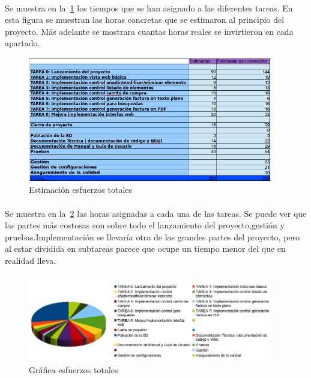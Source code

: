 
\paragraph{} Se muestra en la~\cref{fig:6121} los tiempos que se han asignado a las diferentes tareas. En esta figura se muestran las horas concretas que se estimaron al principio del proyecto. Más adelante se mostrara cuantas horas reales se invirtieron en cada apartado.

\begin{figure}[h!]
\centering
\includegraphics[width=0.95\textwidth]{img/6121}
\caption{Estimación esfuerzos totales}
 \label{fig:6121}
\end{figure}

\paragraph{} Se muestra en la~\cref{fig:6122} las horas asignadas a cada una de las tareas. Se puede ver que las partes más costosas son sobre todo el lanzamiento del proyecto,gestión y pruebas.Implementación se llevaría otra de las grandes partes del proyecto, pero al estar dividida en subtareas parece que ocupe un tiempo menor del que en realidad lleva.

\begin{figure}[h!]
\centering
\includegraphics[width=0.95\textwidth]{img/6122}
\caption{Gráfica esfuerzos totales}
 \label{fig:6122}
\end{figure}